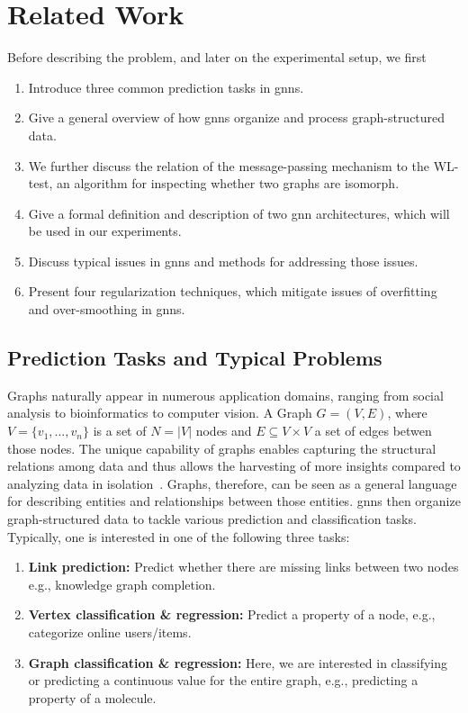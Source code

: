 %
\chapter{Related Work}
\label{sec:related}

Before describing the problem, and later on the experimental setup, we first
\begin{enumerate}
    \item Introduce three common prediction tasks in \acp{gnn}.
    \item Give a general overview of how \acp{gnn} organize and process graph-structured data.
    \item We further discuss the relation of the message-passing mechanism to the WL-test, an algorithm for
          inspecting whether two graphs are isomorph.
    \item Give a formal definition and description of two \ac{gnn}
          architectures, which will be used in our experiments.
    \item Discuss typical issues in \acp{gnn} and methods for addressing those issues.
    \item Present four regularization techniques, which mitigate issues of overfitting and over-smoothing in \acp{gnn}.
\end{enumerate}

\section{Prediction Tasks and Typical Problems}
\label{sec:related:pred}

Graphs naturally appear in numerous application domains, ranging from social analysis to bioinformatics to computer vision.
A Graph $G = (V,E)$, where $V = \{v_{1},...,v_{n}\}$ is a set of $N =|V|$ nodes and $E \subseteq V\times V$ a set of edges betwen those nodes. The unique capability of graphs enables capturing the structural relations among data and thus allows the harvesting of more insights compared to analyzing data in isolation~\cite{Zhang19}. Graphs, therefore, can be seen as a general language for describing entities and relationships between those entities.
\Acfp{gnn} then organize graph-structured data to tackle various prediction and classification
tasks. Typically, one is interested in one of the following three tasks:
\begin{enumerate}[label=\textbf{\arabic*.}]
    \item \textbf{Link prediction:}
          Predict whether there are missing links between two nodes
          e.g., knowledge graph completion.

    \item \textbf{Vertex classification \& regression:}
          Predict a property of a node, e.g., categorize online users/items.

    \item \textbf{Graph classification \& regression:}
          Here, we are interested in classifying or predicting a continuous value for
          the entire graph, e.g., predicting a property of a molecule.
\end{enumerate}

